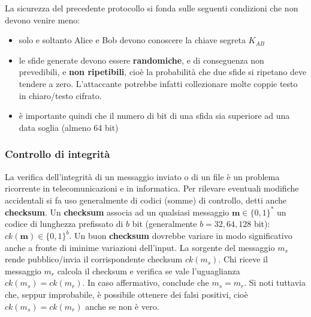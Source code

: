 La sicurezza del precedente protocollo si fonda sulle seguenti condizioni che non devono venire meno:
\begin{itemize}
  \item solo e soltanto Alice e Bob devono conoscere la chiave segreta $K_{AB}$
  \item le sfide generate devono essere \textbf{randomiche}, e di conseguenza non prevedibili, e \textbf{non ripetibili}, cioè la probabilità che due sfide si ripetano deve tendere a zero. L'attaccante potrebbe infatti collezionare molte coppie testo in chiaro/testo cifrato.
  \item è importante quindi che il numero di bit di una sfida sia superiore ad una data soglia (almeno 64 bit)
\end{itemize}

\subsubsection{Controllo di integrità}
La verifica dell’integrità di un messaggio inviato o di un file è un problema ricorrente in telecomunicazioni e in informatica. Per rilevare eventuali modifiche accidentali si fa uso generalmente di codici (somme) di controllo, detti anche \textbf{checksum}. Un \textbf{checksum} associa ad un qualsiasi messaggio $\textbf{m} \in \{0,1\}^*$ un codice di lunghezza prefissato di $b$ bit (generalmente $b = 32,64,128$ bit): $ck(\textbf{m}) \in \{0,1\}^b$. Un buon \textbf{checksum} dovrebbe variare in modo significativo anche a fronte di iminime variazioni dell'input. \newline \newline 
La sorgente del messaggio $m_{s}$ rende pubblico/invia il corrispondente checksum $ck(m_{s})$. Chi riceve il messaggio $m_{r}$ calcola il checksum e verifica se vale l'uguaglianza $ck(m_{s}) = ck(m_{r})$. In caso affermativo, conclude che $m_{s} = m_{r}$. Si noti tuttavia che, seppur improbabile, è possibile ottenere dei falsi positivi, cioè $ck(m_{s}) = ck(m_{r} )$ anche se non è vero.

